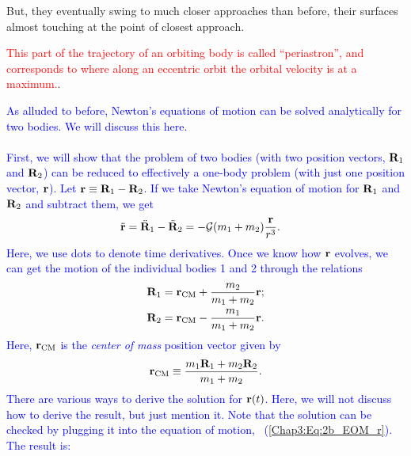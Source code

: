 \documentclass[main.tex]{subfiles}
\begin{document}
\par \nar But, they eventually swing to much closer approaches than before, their surfaces almost touching at the point of closest approach.

\begin{tcolorbox}[sharp corners, colback=red!30, colframe=red!80!blue, title=Periastron]
\par \textcolor{red}{This part of the trajectory of an orbiting body is called ``periastron'', and corresponds to where along an eccentric orbit the orbital velocity is at a maximum.}.  
\end{tcolorbox}


\begin{tcolorbox}[sharp corners, colback=blue!30, colframe=blue!80!blue, title=Orbital Dynamics IIb]
\par \textcolor{blue}{As alluded to before, Newton's equations of motion can be solved analytically for two bodies. We will discuss this here. \\ \\
First, we will show that the problem of two bodies (with two position vectors, ${\mathbf{R}}_1$ and ${\mathbf{R}}_2$) can be reduced to effectively a one-body problem (with just one position vector, ${\mathbf{r}}$). Let ${\mathbf{r}} \equiv {\mathbf{R}}_1 - {\mathbf{R}}_2$. If we take Newton's equation of motion for ${\mathbf{R}}_1$ and ${\mathbf{R}}_2$ and subtract them, we get
\begin{align}
\label{Chap3:Eq:2b_EOM_r}
\ddot{{\mathbf{r}}} &= \ddot{{\mathbf{R}}}_1 - \ddot{{\mathbf{R}}}_2 =  -\mathcal{G} (m_1+m_2)  \frac{{\mathbf{r}}}{r^3}.
\end{align}
Here, we use dots to denote time derivatives. Once we know how ${\mathbf{r}}$ evolves, we can get the motion of the individual bodies 1 and 2 through the relations
\begin{subequations}
\label{Chap3:Eq:R_r_relations}
\begin{align}
{\mathbf{R}}_1 &= {\mathbf{r}}_\mathrm{CM} + \frac{m_2}{m_1+m_2} {\mathbf{r}}; \\
{\mathbf{R}}_2 &= {\mathbf{r}}_\mathrm{CM} - \frac{m_1}{m_1+m_2} {\mathbf{r}}.
\end{align}
\end{subequations}
Here, ${\mathbf{r}}_\mathrm{CM}$ is the {\it center of mass} position vector given by
\begin{align}
\label{Chap3:Eq:r_CM_def}
{\mathbf{r}}_\mathrm{CM} \equiv \frac{m_1 {\mathbf{R}}_1 + m_2 {\mathbf{R}}_2}{m_1+m_2}.
\end{align} 
There are various ways to derive the solution for ${\mathbf{r}}(t)$. Here, we will not discuss how to derive the result, but just mention it. Note that the solution can be checked by plugging it into the equation of motion, \Eq~(\ref{Chap3:Eq:2b_EOM_r}). The result is:
}
\end{tcolorbox}
\end{document}
